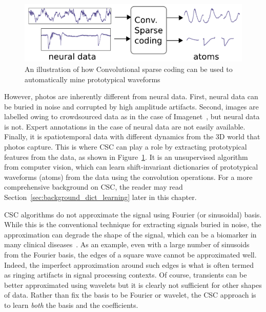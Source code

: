 \begin{figure}[t]
\begin{center}
   \includegraphics[width=0.85\linewidth]{figures/schema.pdf}
\end{center}
   \caption[]{An illustration of how Convolutional sparse coding can be used to automatically mine prototypical waveforms}
   \label{fig:sommaire:csc_schematic}
\end{figure}

However, photos are inherently different from neural data. First, neural data can be buried in noise and corrupted by high amplitude artifacts. Second, images are labelled owing to crowdsourced data as in the case of  Imagenet~\citep{deng2009imagenet}, but neural data is not. 
Expert annotations in the case of neural data are not easily available.
Finally, it is spatiotemporal data with different dynamics from the 3D world that photos capture. This is where \ac{CSC} can play a role by extracting prototypical features from the data, as shown in Figure~\ref{fig:sommaire:csc_schematic}. It is an unsupervised algorithm from computer vision, which can learn shift-invariant dictionaries of prototypical waveforms (atoms) from the data using the convolution operations. For a more comprehensive background on \ac{CSC}, the reader may read Section~\ref{sec:background_dict_learning} later in this chapter.

\ac{CSC} algorithms do not approximate the signal using Fourier (or sinusoidal) basis. While this is the conventional technique for extracting signals buried in noise, the approximation can degrade the shape of the signal, which can be a biomarker in many clinical diseases~\citep{cole2017brain}. As an example, even with a large number of sinusoids from the Fourier basis, the edges of a square wave cannot be approximated well. Indeed, the imperfect approximation around such edges is what is often termed as ringing artifacts in signal processing contexts. Of course, transients can be better approximated using wavelets but it is clearly not sufficient for other shapes of data. Rather than fix the basis to be Fourier or wavelet, the \ac{CSC} approach is to learn \emph{both} the basis and the coefficients.

